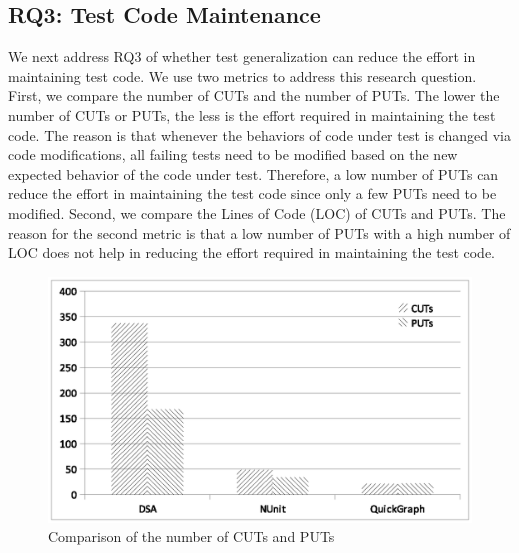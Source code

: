 \subsection{RQ3: Test Code Maintenance}

We next address RQ3 of whether test generalization can reduce the effort in maintaining test code. We use two metrics to address this research question. First, we compare the number of CUTs and the number of PUTs. The lower the number of CUTs or PUTs, the less is the effort required in maintaining the test code. The reason is that whenever the behaviors of code under test is changed via code modifications, all failing tests need to be modified based on the new expected behavior of the code under test. Therefore, a low number of PUTs can reduce the effort in maintaining the test code since only a few PUTs need to be modified. Second, we compare the Lines of Code (LOC) of CUTs and PUTs. The reason for the second metric is that a low number of PUTs with a high number of LOC does not help in reducing the effort required in maintaining the test code.

\begin{figure}[t]
\centering
\includegraphics[scale=0.60,clip,trim=190 200 00 150]{charts/CUTs_PUTs_1.eps}\vspace*{-4ex}
\caption{\label{fig:cutsnputs}Comparison of the number of CUTs and PUTs} \vspace*{-4ex}
\end{figure}

